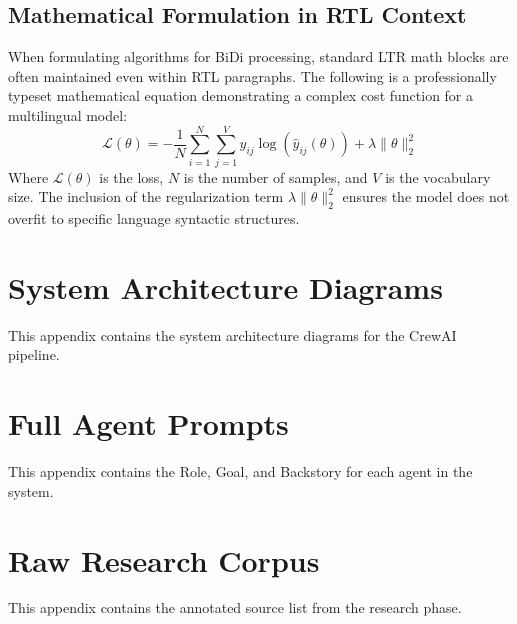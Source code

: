 \documentclass[a4paper,12pt,oneside]{memoir}
\begin{document}
\section{Mathematical Formulation in RTL Context}
When formulating algorithms for BiDi processing, standard LTR math blocks are often maintained even within RTL paragraphs. The following is a professionally typeset mathematical equation demonstrating a complex cost function for a multilingual model:
\begin{equation}
\mathcal{L}(\theta) = -\frac{1}{N} \sum_{i=1}^{N} \sum_{j=1}^{V} y_{ij} \log(\hat{y}_{ij}(\theta)) + \lambda \| \theta \|_2^2
\end{equation}
Where $\mathcal{L}(\theta)$ is the loss, $N$ is the number of samples, and $V$ is the vocabulary size. The inclusion of the regularization term $\lambda \| \theta \|_2^2$ ensures the model does not overfit to specific language syntactic structures.

\backmatter

\printbibliography[heading=bibintoc,title={References}]

\printglossaries

\printindex

\appendix
\chapter{System Architecture Diagrams}
This appendix contains the system architecture diagrams for the CrewAI pipeline.

\chapter{Full Agent Prompts}
This appendix contains the Role, Goal, and Backstory for each agent in the system.

\chapter{Raw Research Corpus}
This appendix contains the annotated source list from the research phase.


\end{document}

